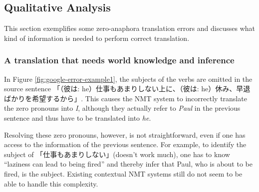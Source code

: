 \documentclass[11pt,a4paper]{article}
\begin{document}
\subsection{Qualitative Analysis}
\label{sec:qualitative-anaphora}

This section exemplifies some zero-anaphora translation errors and discusses what kind of information is needed to perform correct translation.

\begin{CJK}{UTF8}{min}

\subsubsection*{A translation that needs world knowledge and inference}
In Figure \ref{fig:google-error-example1}, the subjects of the verbs are omitted in the source sentence 「（彼は: he）仕事もあまりしない上に、（彼は: he）休み、早退ばかりを希望するから」. This causes the NMT system to incorrectly translate the zero pronouns into {\it I}, although they actually refer to {\it Paul} in the previous sentence and thus have to be translated into {\it he}.

Resolving these zero pronouns, however, is not straightforward, even if one has access to the information of the previous sentence. For example, to identify the subject of 「仕事もあまりしない」(doesn't work much), one has to know ``laziness can lead to being fired'' and thereby infer that Paul, who is about to be fired, is the subject. Existing contextual NMT systems \citep{voita-etal-2018-context, EvaluatingDiscourse:2018vp, Maruf:2019vc} still do not seem to be able to handle this complexity.
\end{CJK}
\end{document}
